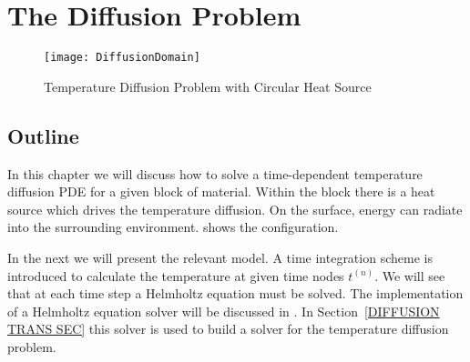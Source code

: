 
%
%
%

\section{The Diffusion Problem}
\label{DIFFUSION CHAP}

\begin{figure}
\centerline{\texttt{[image: DiffusionDomain]}}
\caption{Temperature Diffusion Problem with Circular Heat Source}
\label{DIFFUSION FIG 1}
\end{figure}

\subsection{\label{DIFFUSION OUT SEC}Outline}
In this chapter we will discuss how to solve a time-dependent temperature
diffusion PDE for a given block of material.
Within the block there is a heat source which drives the temperature diffusion.
On the surface, energy can radiate into the surrounding environment.
 shows the configuration.

In the next  we will present the relevant model.
A time integration scheme is introduced to calculate the temperature at given time nodes $t^{(n)}$.
We will see that at each time step a Helmholtz equation must be solved. 
The implementation of a Helmholtz equation solver will be discussed in . 
In Section~\ref{DIFFUSION TRANS SEC} this solver is used to build a solver for
the temperature diffusion problem.

